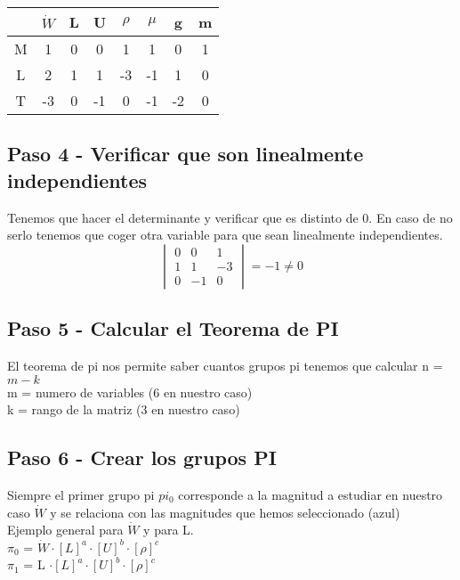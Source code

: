 \documentclass[10pt,a4paper]{article}
\begin{document}
 \begin{center}
\begin{tabular}{ c | c | c | c | c | c | c | c}
  & \cellcolor{red!25}$\dot{W}$ & \cellcolor{blue!25}L & \cellcolor{blue!25}U & \cellcolor{blue!25}$\rho$ & $\mu$ & g & m\\
    \hline
    M & 1 & 0 & 0  & 1 & 1 & 0 & 1 \\
    L & 2 & 1 & 1 & -3 & -1 & 1 & 0\\
    T & -3 & 0 & -1 & 0 & -1 & -2 & 0\\
 \end{tabular}
 \end{center}
 
 \subsection{Paso 4 - Verificar que son linealmente independientes}
 Tenemos que hacer el determinante y verificar que es distinto de 0. En caso de no serlo tenemos que coger otra variable para que sean linealmente independientes.
 \begin{equation}
\begin{vmatrix}
0 &  0 & 1\\
1 & 1 & -3\\
0 & -1 & 0
\end{vmatrix}
= -1 \not = 0
\end{equation}

\subsection{Paso 5 - Calcular el Teorema de PI}
El teorema de pi nos permite saber cuantos grupos pi tenemos que calcular
n = $m - k$
\\

m = numero de variables (6 en nuestro caso)
\\
k = rango de la matriz (3 en nuestro caso)

\subsection{Paso 6 - Crear los grupos PI}
Siempre el primer grupo pi $pi_0$ corresponde a la magnitud a estudiar en nuestro caso $\dot{W}$ y se relaciona con las magnitudes que hemos seleccionado (azul)
\\

Ejemplo general para $\dot{W}$ y para L.
\\
\vspace{0.2cm}
$\pi_0$ = $\dot{W} \cdot \left[L \right]^a \cdot \left[U \right]^b \cdot \left[\rho \right]^c$
\\
\vspace{0.2cm}
$\pi_1$ = L $\cdot \left[L \right]^a \cdot \left[U \right]^b \cdot \left[\rho \right]^c$
\end{document}
